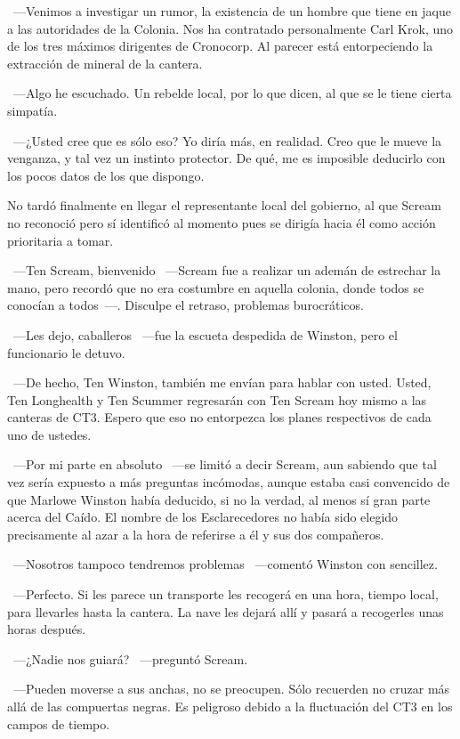 ~---Venimos a investigar un rumor, la existencia de un hombre que tiene en jaque a las autoridades de la Colonia. Nos ha contratado personalmente Carl Krok, uno de los tres máximos dirigentes de Cronocorp. Al parecer está entorpeciendo la extracción de mineral de la cantera.

~---Algo he escuchado. Un rebelde local, por lo que dicen, al que se le tiene cierta simpatía.

~---¿Usted cree que es sólo eso? Yo diría más, en realidad. Creo que le mueve la venganza, y tal vez un instinto protector. De qué, me es imposible deducirlo con los pocos datos de los que dispongo.

No tardó finalmente en llegar el representante local del gobierno, al que Scream no reconoció pero sí identificó al momento pues se dirigía hacia él como acción prioritaria a tomar.

~---Ten Scream, bienvenido ~---Scream fue a realizar un ademán de estrechar la mano, pero recordó que no era costumbre en aquella colonia, donde todos se conocían a todos~---. Disculpe el retraso, problemas burocráticos.

~---Les dejo, caballeros ~---fue la escueta despedida de Winston, pero el funcionario le detuvo.

~---De hecho, Ten Winston, también me envían para hablar con usted. Usted, Ten Longhealth y Ten Scummer regresarán con Ten Scream hoy mismo a las canteras de CT3. Espero que eso no entorpezca los planes respectivos de cada uno de ustedes.

~---Por mi parte en absoluto ~---se limitó a decir Scream, aun sabiendo que tal vez sería expuesto a más preguntas incómodas, aunque estaba casi convencido de que Marlowe Winston había deducido, si no la verdad, al menos sí gran parte acerca del Caído. El nombre de los Esclarecedores no había sido elegido precisamente al azar a la hora de referirse a él y sus dos compañeros.

~---Nosotros tampoco tendremos problemas ~---comentó Winston con sencillez.

~---Perfecto. Si les parece un transporte les recogerá en una hora, tiempo local, para llevarles hasta la cantera. La nave les dejará allí y pasará a recogerles unas horas después.

~---¿Nadie nos guiará? ~---preguntó Scream.

~---Pueden moverse a sus anchas, no se preocupen. Sólo recuerden no cruzar más allá de las compuertas negras. Es peligroso debido a la fluctuación del CT3 en los campos de tiempo.

